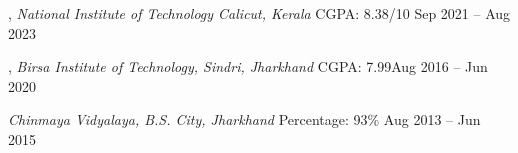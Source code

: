 
, \textit{National Institute of Technology Calicut, Kerala}{ CGPA: 8.38/10}	\hfill Sep 2021 – Aug 2023

, \textit{Birsa Institute of Technology, Sindri, Jharkhand} { CGPA: 7.99}\hfill	Aug 2016 -- Jun 2020

  \textit{Chinmaya Vidyalaya, B.S. City, Jharkhand} { Percentage: 93\%}	\hfill Aug 2013 -- Jun 2015




